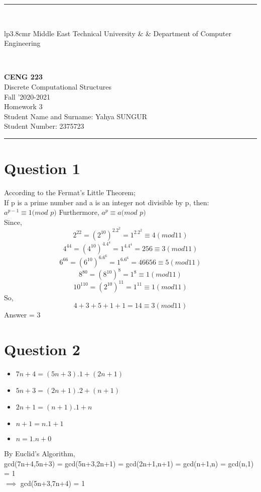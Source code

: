 \documentclass[12pt]{article}
\newcommand{\HRule}{\rule{\linewidth}{1mm}}
\begin{document}
\noindent
\HRule \\[3mm]
\small
\begin{tabular}[b]{lp{3.8cm}r}
{} Middle East Technical University &  &
{} Department of Computer Engineering \\
\end{tabular} \\
\begin{center}

                 \LARGE \textbf{CENG 223} \\[4mm]
                 \Large Discrete Computational Structures \\[4mm]
                \normalsize Fall '2020-2021 \\
                    \Large Homework 3 \\
                \normalsize Student Name and Surname: Yahya SUNGUR  \\
                \normalsize Student Number: 2375723  \\
\end{center}
\HRule


\section*{Question 1}
According to the Fermat's Little Theorem; \\
If p is a prime number and a is an integer not divisible by p, then: \\
$a^{p-1} \equiv 1 (mod$ $p)$ Furthermore, $a^{p} \equiv a (mod$ $p)$ \\
Since,
$$
    2^{22} = (2^{10})^2.2^2 = 1^2.2^2 \equiv 4 (mod 11)
$$
$$
    4^{44} = (4^{10})^4.4^4 = 1^4.4^4 = 256 \equiv 3 (mod 11)
$$
$$
    6^{66} = (6^{10})^6.6^6 = 1^6.6^6 = 46656 \equiv 5 (mod 11)
$$
$$
    8^{80} = (8^{10})^8 = 1^8 \equiv 1 (mod 11)
$$
$$
    10^{110} = (2^{10})^{11} = 1^{11} \equiv 1 (mod 11)
$$
So,
$$
    4+3+5+1+1 = 14 \equiv 3 (mod 11)
$$
Answer = 3

\section*{Question 2}
\begin{itemize}
    \item $7n + 4 = (5n + 3).1 + (2n + 1)$
    \item $5n + 3 = (2n + 1).2 + (n + 1)$
    \item $2n + 1 = (n + 1).1 + n$
    \item $n + 1 = n.1 + 1$
    \item $n = 1.n + 0$
\end{itemize}
By Euclid's Algorithm, \\
gcd(7n+4,5n+3) = gcd(5n+3,2n+1) = gcd(2n+1,n+1) = gcd(n+1,n) = gcd(n,1) = 1 \\
$\implies$ gcd(5n+3,7n+4) = 1
\end{document}
